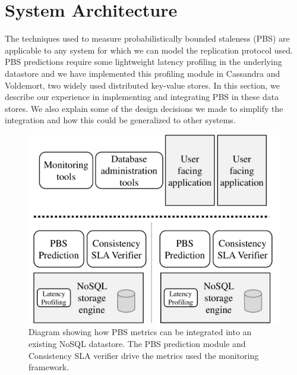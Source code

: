\section{System Architecture}
\label{sec:architecture}

The techniques used to measure probabilistically bounded staleness (PBS) are
applicable to any system for which we can model the replication protocol used.
PBS predictions require some lightweight latency profiling in the underlying
datastore and we have implemented this profiling module in Cassandra and
Voldemort, two widely used distributed key-value stores. In this section, we
describe our experience in implementing and integrating PBS in these data
stores. We also explain some of the design decisions we made to simplify the
integration and how this could be generalized to other systems. 


\begin{figure}
\centering
\includegraphics[width=.90\columnwidth]{figs/pbs-sys-arch.pdf}
\caption{Diagram showing how PBS metrics can be integrated into an existing
NoSQL datastore. The PBS prediction module and Consistency SLA verifier drive
the metrics used the monitoring framework.}
\label{fig:pbs-sys-arch}
\end{figure}

